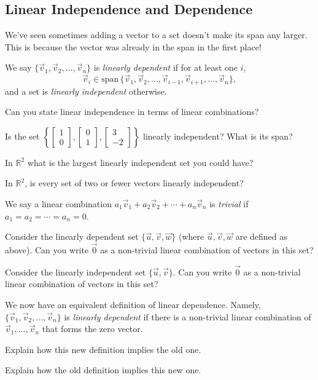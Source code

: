 \documentclass{article}
\newcommand{\R}{\mathbb{R}}
\renewcommand{\span}{\mathrm{span}\,}
\newcommand{\mat}[1]{\begin{bmatrix}#1\end{bmatrix}}
\begin{document}
\subsection*{Linear Independence and Dependence}
	We've seen sometimes adding a vector to a set doesn't
	make its span any larger.  This is because the vector was already
	in the span in the first place!

	We say $\{\vec v_1,\vec v_2,\ldots,\vec v_n\}$ is
	\emph{linearly dependent} if for at least one $i$,
	\[
		\vec v_i\in\span\{\vec v_1,\vec v_2,\ldots,\vec v_{i-1},
		\vec v_{i+1},\ldots,\vec v_n\},
	\]
	and a set is \emph{linearly independent} otherwise.

	\begin{Enum}
		\item Can you state linear independence in terms
		of linear combinations?
		\item Is the set $\left\{\mat{1\\0},\mat{0\\1},
		\mat{3\\-2}\right\}$ linearly independent?
		What is its span?
		\item In $\R^2$ what is the largest linearly
		independent set you could have?
		\item In $\R^2$, is every set of two or fewer
		vectors linearly independent?
	\end{Enum}

	We say a linear combination 
	$a_1\vec v_1+a_2\vec v_2+\cdots +a_n\vec v_n$
	is \emph{trivial} if $a_1=a_2=\cdots=a_n=0$.
	\begin{Enum}
		\item Consider the linearly dependent 
		set $\{\vec u,\vec v,\vec w\}$ (where $\vec u,\vec v,\vec w$
		are defined as above).  Can you write $\vec 0$
		as a non-trivial linear combination of vectors in this set?
		\item Consider the linearly independent 
		set $\{\vec u,\vec v\}$.  Can you write $\vec 0$
		as a non-trivial linear combination of vectors in this set?
	\end{Enum}

	We now have an equivalent definition of linear dependence.
	Namely, $\{\vec v_1,\vec v_2,\ldots,\vec v_n\}$ is
	\emph{linearly dependent} if there is a non-trivial
	linear combination of $\vec v_1,\ldots,\vec v_n$ that
	forms the zero vector.

	\begin{Enum}
		\item Explain how this new definition implies the old one.
		\item Explain how the old definition implies this new one.
	\end{Enum}
\end{document}
